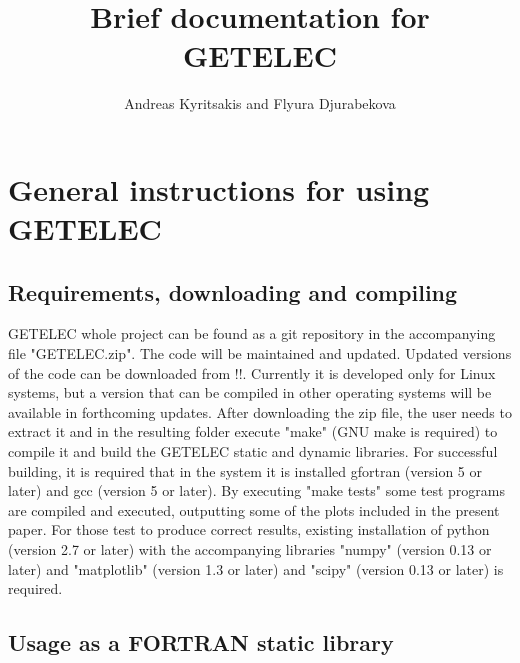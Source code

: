 \documentclass[notitlepage
]{revtex4-1}
\begin{document}
\title{Brief documentation for GETELEC}

\author{Andreas Kyritsakis and Flyura Djurabekova}


\maketitle


\section{General instructions for using GETELEC}
\label{sec:Gen}

\subsection{Requirements, downloading and compiling}

GETELEC whole project can be found as a git repository in the accompanying file "GETELEC.zip". The code will be maintained and updated. Updated versions of the code can be downloaded from !!. Currently it is developed only for Linux systems, but a version that can be compiled in other operating systems will be available in forthcoming updates. After downloading the zip file, the user needs to extract it and in the resulting folder execute "make" (GNU make is required) to compile it and build the GETELEC static and dynamic libraries. For successful building, it is required that in the system it is installed gfortran (version 5 or later) and gcc (version 5 or later). By executing "make tests" some test programs are compiled and executed, outputting some of the plots included in the present paper. For those test to produce correct results, existing installation of python (version 2.7 or later) with the accompanying libraries "numpy" (version 0.13 or later) and "matplotlib" (version 1.3 or later) and "scipy" (version 0.13 or later) is required.

\subsection{Usage as a FORTRAN static library}   
\end{document}
